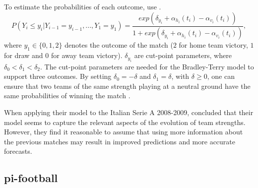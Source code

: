 To estimate the probabilities of each outcome, \citet{bib:cattelan-varin-firth-2013} use .
\begin{equation}
    P(Y_{i} \leq y_{i} | Y_{i-1} = y_{i-1}, ..., Y_{1} = y_{1}) = \frac{exp(\delta_{y_{i}} + \alpha_{h_{i}}(t_{i}) - \alpha_{v_{i}}(t_{i}))}{1 + exp(\delta_{y_{i}} + \alpha_{h_{i}}(t_{i}) - \alpha_{v_{i}}(t_{i}))},
    \label{eq:cattelan-varin-firth-model}
\end{equation}
where $y_{1} \in \{0, 1, 2\}$ denotes the outcome of the match ($2$ for home team victory, $1$ for draw and $0$ for away team victory). $\delta_{y_{i}}$ are cut-point parameters, where $\delta_{0} < \delta_{1} < \delta_{2}$. The cut-point parameters are needed for the Bradley-Terry model to support three outcomes. By setting $\delta_{0} = -\delta$ and $\delta_{1} = \delta$, with $\delta \geq 0$, one can ensure that two teams of the same strength playing at a neutral ground have the same probabilities of winning the match \citep{bib:cattelan-varin-firth-2013}.

When applying their model to the Italian Serie A 2008-2009, \citet{bib:cattelan-varin-firth-2013} concluded that their model seems to capture the relevant aspects of the evolution of team strengths. However, they find it reasonable to assume that using more information about the previous matches may result in improved predictions and more accurate forecasts.


\subsection{pi-football}
\label{subsec:pi-football}

